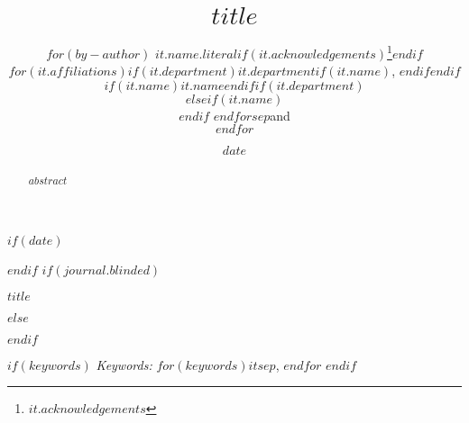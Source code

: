 \def\spacingset#1{\renewcommand{\baselinestretch}%
{#1}\small\normalsize} \spacingset{1}

\renewcommand*{\arraystretch}{0.5} %


$if(date)$
\date{$date$}
$endif$
$if(journal.blinded)$
\spacingset{.8}
\bigskip
\bigskip
\bigskip
\begin{center}
  {\LARGE\bf $title$}
\end{center}
\smallskip
\bigskip
\spacingset{1}
$else$
\title{\bf $title$}
\author{
$for(by-author)$
$it.name.literal$$if(it.acknowledgements)$\thanks{$it.acknowledgements$}$endif$ \vspace{0.2em}\\
$for(it.affiliations)$$if(it.department)$$it.department$$if(it.name)$, $endif$$endif$$if(it.name)$$it.name$$endif$$if(it.department)$ \vspace{0.2em}\\$elseif(it.name)$\\$endif$
$endfor$$sep$and \vspace{0.2em}\\$endfor$}
\maketitle
$endif$

\bigskip
\bigskip
\begin{abstract}
$abstract$
\end{abstract}

$if(keywords)$
\noindent%
{\it Keywords:} $for(keywords)$$it$$sep$, $endfor$
\vfill
$endif$

\newpage
